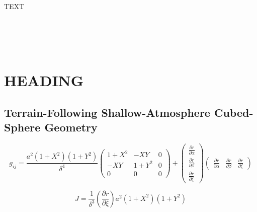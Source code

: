 \documentclass[gmdd, hvmath, online]{copernicus_discussions}
\newcommand{\pdiff}[2]{\frac{\partial #1}{\partial #2}}
\begin{document}
\conclusions  %
TEXT




\appendix
\section{\\ \\ \hspace*{-7mm} HEADING}    %


\subsection{Terrain-Following Shallow-Atmosphere Cubed-Sphere Geometry}

\begin{equation}
g_{ij} = \frac{a^2 (1+X^2) (1+Y^2)}{\delta^4} \left( \begin{array}{ccc} 1+X^2 & - X Y & 0 \\[2.0ex] - X Y & 1+Y^2 & 0 \\[2.0ex] 0 & 0 & 0 \end{array} \right) + \left( \begin{array}{c} \pdiff{r}{\alpha} \\[2.0ex] \pdiff{r}{\beta} \\[2.0ex] \pdiff{r}{\xi} \end{array} \right) \left( \begin{array}{ccc} \pdiff{r}{\alpha} & \pdiff{r}{\beta} & \pdiff{r}{\xi} \end{array} \right)
\end{equation}

\begin{equation}
J = \frac{1}{\delta^3} \left( \pdiff{r}{\xi} \right) a^2 (1+X^2) (1+Y^2)
\end{equation}
\end{document}
